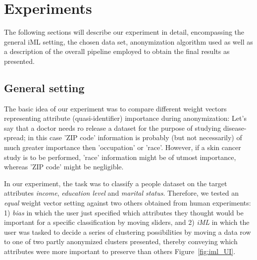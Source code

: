 \documentclass{llncs}
\begin{document}
\section{Experiments}
\label{sect:experiments}

The following sections will describe our experiment in detail, encompassing the general iML setting, the chosen  data set, anonymization algorithm used as well as a description of the overall pipeline employed to obtain the final results as presented.


\subsection{General setting}
\label{sect:setting}

The basic idea of our experiment was to compare different weight vectors representing attribute (quasi-identifier) importance during anonymization: Let's say that a doctor needs ro release a dataset for the purpose of studying disease-spread; in this case 'ZIP code' information is probably (but not necessarily) of much greater importance then 'occupation' or 'race'. However, if a skin cancer study is to be performed, 'race' information might be of utmost importance, whereas 'ZIP code' might be negligible.

In our experiment, the task was to classify a people dataset on the target attributes \textit{income}, \textit{education level} and \textit{marital status}. Therefore, we tested an \textit{equal} weight vector setting against two others obtained from human experiments: 1) \textit{bias} in which the user just specified which attributes they thought would be important for a specific classification by moving sliders, and 2) \textit{iML} in which the user was tasked to decide a series of clustering possibilities by moving a data row to one of two partly anonymized clusters presented, thereby conveying which attributes were more important to preserve than others Figure~\ref{fig:iml_UI}.
\end{document}
